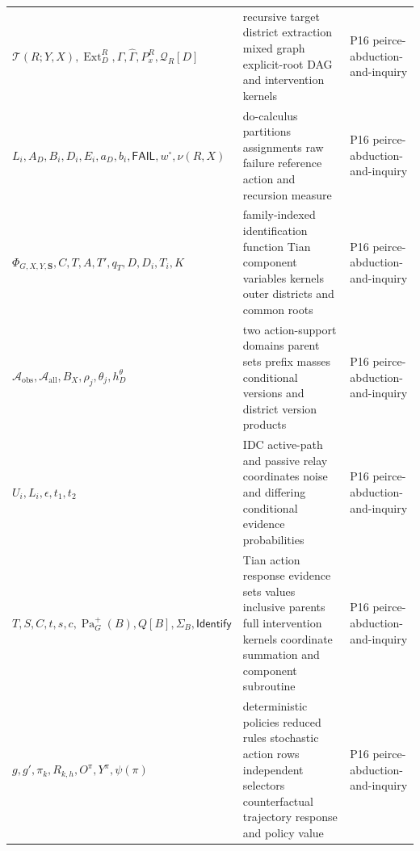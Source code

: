 \begin{longtable}{@{}p{}p{}p{}@{}}
\(\mathcal T(R;\allowbreak Y,\allowbreak X),\allowbreak \operatorname{Ext}^R_D,\allowbreak \Gamma,\allowbreak \widehat\Gamma,\allowbreak P^R_x,\allowbreak \mathcal Q_R[D]\) & recursive target district extraction mixed graph explicit-root DAG and intervention kernels & P16 peirce-\allowbreak{}abduction-\allowbreak{}and-\allowbreak{}inquiry \\
\(L_i,\allowbreak A_D,\allowbreak B_i,\allowbreak D_i,\allowbreak E_i,\allowbreak a_D,\allowbreak b_i,\allowbreak \mathsf{FAIL},\allowbreak w^\circ,\allowbreak \nu(R,\allowbreak X)\) & do-calculus partitions assignments raw failure reference action and recursion measure & P16 peirce-\allowbreak{}abduction-\allowbreak{}and-\allowbreak{}inquiry \\
\(\Phi_{G,X,Y,\mathbf S},\allowbreak C,\allowbreak T,\allowbreak A,\allowbreak T',\allowbreak q_T,\allowbreak D,\allowbreak D_i,\allowbreak T_i,\allowbreak K\) & family-indexed identification function Tian component variables kernels outer districts and common roots & P16 peirce-\allowbreak{}abduction-\allowbreak{}and-\allowbreak{}inquiry \\
\(\mathcal A_{\mathrm{obs}},\allowbreak \mathcal A_{\mathrm{all}},\allowbreak B_X,\allowbreak \rho_j,\allowbreak \theta_j,\allowbreak h_D^\theta\) & two action-support domains parent sets prefix masses conditional versions and district version products & P16 peirce-\allowbreak{}abduction-\allowbreak{}and-\allowbreak{}inquiry \\
\(U_i,\allowbreak L_i,\allowbreak \epsilon,\allowbreak t_1,\allowbreak t_2\) & IDC active-path and passive relay coordinates noise and differing conditional evidence probabilities & P16 peirce-\allowbreak{}abduction-\allowbreak{}and-\allowbreak{}inquiry \\
\(T,\allowbreak S,\allowbreak C,\allowbreak t,\allowbreak s,\allowbreak c,\allowbreak \operatorname{Pa}^{+}_G(B),\allowbreak Q[B],\allowbreak \Sigma_B,\allowbreak \mathsf{Identify}\) & Tian action response evidence sets values inclusive parents full intervention kernels coordinate summation and component subroutine & P16 peirce-\allowbreak{}abduction-\allowbreak{}and-\allowbreak{}inquiry \\
\(g,\allowbreak g',\allowbreak \pi_k,\allowbreak R_{k,h},\allowbreak O^\pi,\allowbreak Y^\pi,\allowbreak \psi(\pi)\) & deterministic policies reduced rules stochastic action rows independent selectors counterfactual trajectory response and policy value & P16 peirce-\allowbreak{}abduction-\allowbreak{}and-\allowbreak{}inquiry \\

\end{longtable}
